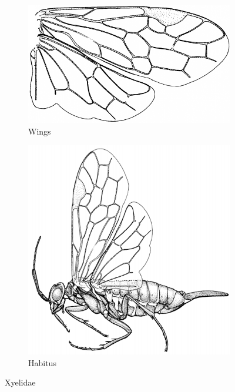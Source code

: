 \documentclass[letterpaper, 11pt]{article}
\begin{document}
\begin{figure}[ht!]
    \centering
    \begin{subfigure}[ht!]{0.4\textwidth}
        \includegraphics[width=\textwidth]{XyelidWings}
        \caption{Wings \citep[][modified from Fig. 32]{goulet1993hymenoptera}}
        \label{fig:xyelidwings}
    \end{subfigure}
    \hfill 
    \begin{subfigure}[ht!]{0.42\textwidth}
        \includegraphics[width=\textwidth]{XyelidHabitus}
        \caption{Habitus \citep[][Fig. 32]{goulet1993hymenoptera}}
        \label{fig:xyelidhead}
    \end{subfigure}
    \caption{Xyelidae}\label{fig:xyelids}
\end{figure}
\end{document}
